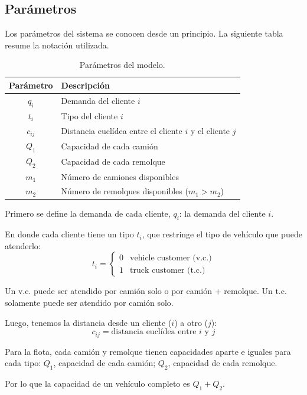 \documentclass[letter, 10pt]{article}
\begin{document}
\subsection{Par\'ametros}
Los par\'ametros del sistema se conocen desde un principio. La siguiente tabla resume la notaci\'on utilizada.

\begin{table}[h]
\centering
\begin{tabular}{cl}
\hline
Par\'ametro & Descripci\'on \\
\hline
$q_i$ & Demanda del cliente $i$ \\
$t_i$ & Tipo del cliente $i$ \\
$c_{ij}$ & Distancia eucl\'idea entre el cliente $i$ y el cliente $j$ \\
$Q_1$ & Capacidad de cada cami\'on \\
$Q_2$ & Capacidad de cada remolque \\
$m_1$ & N\'umero de camiones disponibles \\
$m_2$ & N\'umero de remolques disponibles ($m_1 > m_2$) \\
\hline
\end{tabular}
\caption{Par\'ametros del modelo.}
\end{table}

Primero se define la demanda de cada cliente, $q_i$: la demanda del cliente $i$.

En donde cada cliente tiene un tipo $t_i$, que restringe el tipo de veh\'iculo que puede atenderlo:
\begin{equation}
t_i =
\begin{cases}
0 & \text{vehicle customer (v.c.)} \\
1 & \text{truck customer (t.c.)}
\end{cases}
\end{equation}

Un v.c. puede ser atendido por cami\'on solo o por cami\'on + remolque.
Un t.c. solamente puede ser atendido por cami\'on solo.

Luego, tenemos la distancia desde un cliente ($i$) a otro ($j$):
\begin{equation}
c_{ij} = \text{distancia eucl\'idea entre } i \text{ y } j
\end{equation}

Para la flota, cada cami\'on y remolque tienen capacidades aparte e iguales para cada tipo: $Q_1$, capacidad de cada cami\'on; $Q_2$, capacidad de cada remolque.

Por lo que la capacidad de un veh\'iculo completo es $Q_1 + Q_2$.
\end{document}
